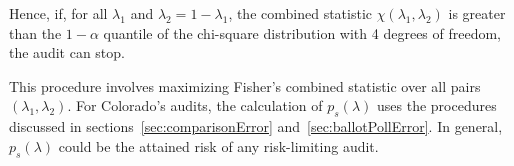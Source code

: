 Hence, if, for all $\lambda_1$ and $\lambda_2 = 1- \lambda_1$,
the combined statistic $\chi(\lambda_1, \lambda_2)$ is greater than the 
$1-\alpha$ quantile of the chi-square
distribution with 4 degrees of freedom, the audit can stop.

This procedure involves maximizing Fisher's combined statistic over all pairs $(\lambda_1, \lambda_2)$.
For Colorado's audits, the calculation of $p_s(\lambda)$ uses the procedures discussed in 
sections~\ref{sec:comparisonError} and~\ref{sec:ballotPollError}.
In general, $p_s(\lambda)$ could be the attained risk of any risk-limiting audit.
